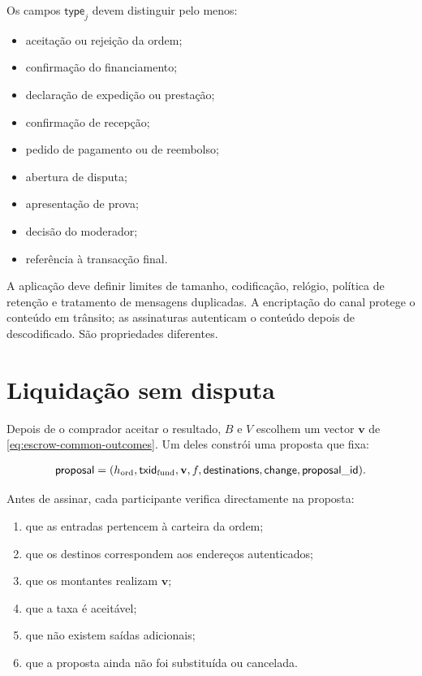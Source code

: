 Os campos \(\mathsf{type}_j\) devem distinguir pelo menos:

\begin{itemize}
 \item aceitação ou rejeição da ordem;
 \item confirmação do financiamento;
 \item declaração de expedição ou prestação;
 \item confirmação de recepção;
 \item pedido de pagamento ou de reembolso;
 \item abertura de disputa;
 \item apresentação de prova;
 \item decisão do moderador;
 \item referência à transacção final.
\end{itemize}

A aplicação deve definir limites de tamanho, codificação, relógio, política de
retenção e tratamento de mensagens duplicadas. A encriptação do canal protege
o conteúdo em trânsito; as assinaturas autenticam o conteúdo depois de
descodificado. São propriedades diferentes.

\section{Liquidação sem disputa}
\label{sec:escrow-cooperative-settlement}

Depois de o comprador aceitar o resultado, \(B\) e \(V\) escolhem um vector
\(\mathbf v\) de \eqref{eq:escrow-common-outcomes}. Um deles constrói uma
proposta que fixa:

\begin{align}
 \mathsf{proposal}=(
 h_{\rm ord},
 \mathsf{txid}_{\rm fund},
 \mathbf v,
 f,
 \mathsf{destinations},
 \mathsf{change},
 \mathsf{proposal\_id}).
 \label{eq:escrow-proposal}
\end{align}

Antes de assinar, cada participante verifica directamente na proposta:

\begin{enumerate}
 \item que as entradas pertencem à carteira da ordem;
 \item que os destinos correspondem aos endereços autenticados;
 \item que os montantes realizam \(\mathbf v\);
 \item que a taxa é aceitável;
 \item que não existem saídas adicionais;
 \item que a proposta ainda não foi substituída ou cancelada.
\end{enumerate}

